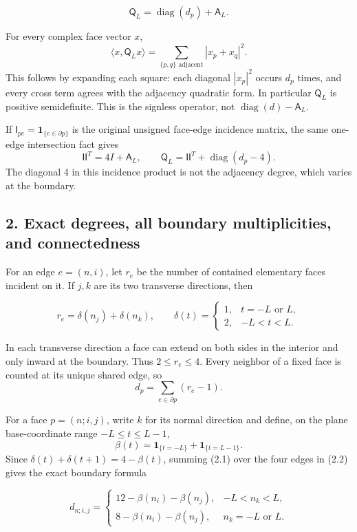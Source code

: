 \documentclass[
  11pt,
]{article}
\begin{document}
\[
\boxed{\mathsf Q_L=\operatorname{diag}(d_p)+\mathsf A_L.}
\tag{1.3}
\]

For every complex face vector \(x\), \[
\langle x,\mathsf Q_Lx\rangle
=\sum_{\{p,q\}\text{ adjacent}}|x_p+x_q|^2.
\tag{1.4}
\] This follows by expanding each square: each diagonal \(|x_p|^2\)
occurs \(d_p\) times, and every cross term agrees with the adjacency
quadratic form. In particular \(\mathsf Q_L\) is positive semidefinite.
This is the signless operator, not
\(\operatorname{diag}(d)-\mathsf A_L\).

If \(\mathsf I_{pe}=\mathbf1_{\{e\in\partial p\}}\) is the original
unsigned face-edge incidence matrix, the same one-edge intersection fact
gives \[
\mathsf I\mathsf I^T=4I+\mathsf A_L,\qquad
\mathsf Q_L=\mathsf I\mathsf I^T+\operatorname{diag}(d_p-4).
\tag{1.5}
\] The diagonal 4 in this incidence product is not the adjacency degree,
which varies at the boundary.

\subsection{2. Exact degrees, all boundary multiplicities, and
connectedness}\label{magnetic-part-6-exact-degrees-all-boundary-multiplicities-and-connectedness}

For an edge \(e=(n,i)\), let \(r_e\) be the number of contained
elementary faces incident on it. If \(j,k\) are its two transverse
directions, then

\[
r_e=\delta(n_j)+\delta(n_k),\qquad
\delta(t)=
\begin{cases}
1,&t=-L\text{ or }L,\\
2,&-L<t<L.
\end{cases}
\tag{2.1}
\]

In each transverse direction a face can extend on both sides in the
interior and only inward at the boundary. Thus \(2\le r_e\le4\). Every
neighbor of a fixed face is counted at its unique shared edge, so \[
d_p=\sum_{e\in\partial p}(r_e-1).
\tag{2.2}
\]

For a face \(p=(n;i,j)\), write \(k\) for its normal direction and
define, on the plane base-coordinate range \(-L\le t\le L-1\), \[
\beta(t)=\mathbf1_{\{t=-L\}}+\mathbf1_{\{t=L-1\}}.
\tag{2.3}
\] Since \(\delta(t)+\delta(t+1)=4-\beta(t)\), summing (2.1) over the
four edges in (2.2) gives the exact boundary formula

\[
\boxed{
d_{n;i,j}=
\begin{cases}
12-\beta(n_i)-\beta(n_j),&-L<n_k<L,\\
8-\beta(n_i)-\beta(n_j),&n_k=-L\text{ or }L.
\end{cases}}
\tag{2.4}
\]
\end{document}

